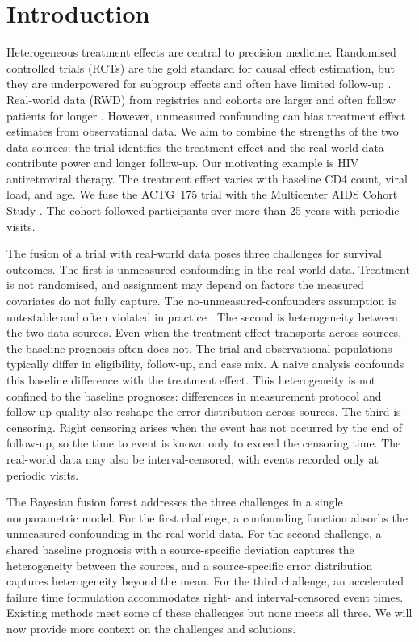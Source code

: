 
\section{Introduction}

Heterogeneous treatment effects are central to precision medicine.
Randomised controlled trials (RCTs) are the gold standard for causal effect estimation, but they are underpowered for subgroup effects and often have limited follow-up \citep{rothwell2005subgroup}.
Real-world data (RWD) from registries and cohorts are larger and often follow patients for longer \citep{sherman2016realworld}.
However, unmeasured confounding can bias treatment effect estimates from observational data.
We aim to combine the strengths of the two data sources: the trial identifies the treatment effect and the real-world data contribute power and longer follow-up.
Our motivating example is HIV antiretroviral therapy.
The treatment effect varies with baseline CD4 count, viral load, and age.
We fuse the ACTG~175 trial \citep{hammer1996} with the Multicenter AIDS Cohort Study \citep{kaslow1987}.
The cohort followed participants over more than 25 years with periodic visits.

The fusion of a trial with real-world data poses three challenges for survival outcomes.
The first is unmeasured confounding in the real-world data.
Treatment is not randomised, and assignment may depend on factors the measured covariates do not fully capture.
The no-unmeasured-confounders assumption is untestable and often violated in practice \citep{vanderweele2017evalue}.
The second is heterogeneity between the two data sources.
Even when the treatment effect transports across sources, the baseline prognosis often does not.
The trial and observational populations typically differ in eligibility, follow-up, and case mix.
A naive analysis confounds this baseline difference with the treatment effect.
This heterogeneity is not confined to the baseline prognoses: differences in measurement protocol and follow-up quality also reshape the error distribution across sources.
The third is censoring.
Right censoring arises when the event has not occurred by the end of follow-up, so the time to event is known only to exceed the censoring time.
The real-world data may also be interval-censored, with events recorded only at periodic visits.

The Bayesian fusion forest addresses the three challenges in a single nonparametric model.
For the first challenge, a confounding function absorbs the unmeasured confounding in the real-world data.
For the second challenge, a shared baseline prognosis with a source-specific deviation captures the heterogeneity between the sources, and a source-specific error distribution captures heterogeneity beyond the mean.
For the third challenge, an accelerated failure time formulation accommodates right- and interval-censored event times.
Existing methods meet some of these challenges but none meets all three.
We will now provide more context on the challenges and solutions.

